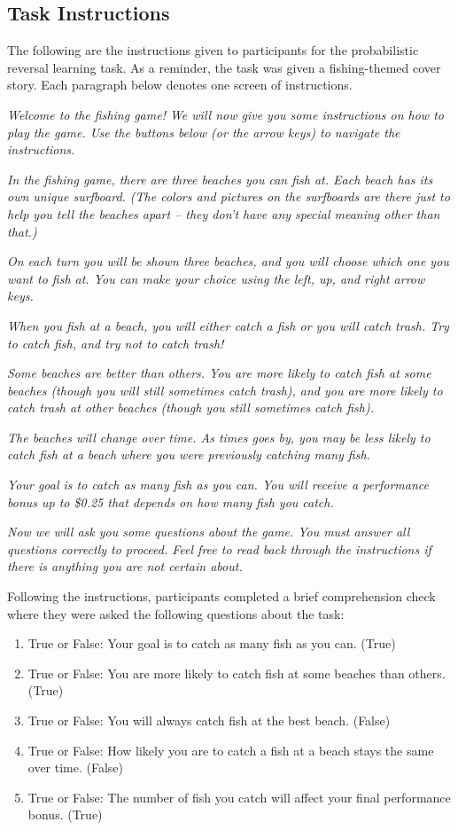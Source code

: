 \documentclass[a4paper,notitlepage,12pt]{article}
\begin{document}
\begin{refsection}[supp]
\clearpage
\subsection*{Task Instructions}

The following are the instructions given to participants for the probabilistic reversal learning task. As a reminder, the task was given a fishing-themed cover story. Each paragraph below denotes one screen of instructions.

\textit{Welcome to the fishing game! We will now give you some instructions on how to play the game. Use the buttons below (or the arrow keys) to navigate the instructions.}

\textit{In the fishing game, there are three beaches you can fish at. Each beach has its own unique surfboard. (The colors and pictures on the surfboards are there just to help you tell the beaches apart – they don’t have any special meaning other than that.)}

\textit{On each turn you will be shown three beaches, and you will choose which one you want to fish at. You can make your choice using the left, up, and right arrow keys.}

\textit{When you fish at a beach, you will either catch a fish or you will catch trash. Try to catch fish, and try not to catch trash!}

\textit{Some beaches are better than others. You are more likely to catch fish at some beaches (though you will still sometimes catch trash), and you are more likely to catch trash at other beaches (though you still sometimes catch fish).}

\textit{The beaches will change over time. As times goes by, you may be less likely to catch fish at a beach where you were previously catching many fish.}

\textit{Your goal is to catch as many fish as you can. You will receive a performance bonus up to \$0.25 that depends on how many fish you catch.}

\textit{Now we will ask you some questions about the game. You must answer all questions correctly to proceed. Feel free to read back through the instructions if there is anything you are not certain about.}

Following the instructions, participants completed a brief comprehension check where they were asked the following questions about the task:

\begin{enumerate}
    \item True or False: Your goal is to catch as many fish as you can. (True)
    \item True or False: You are more likely to catch fish at some beaches than others. (True)
    \item True or False: You will always catch fish at the best beach. (False)
    \item True or False: How likely you are to catch a fish at a beach stays the same over time. (False)
    \item True or False: The number of fish you catch will affect your final performance bonus. (True)
\end{enumerate}


\end{refsection}
\end{document}
